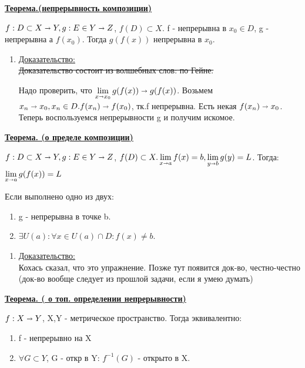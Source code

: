 \documentclass{article}
\newcommand{\thmm}[1]{\underline{\textbf{#1}}}
\newcommand{\prooff}[1]{{\underline{Доказательство:}} \\ }
\begin{document}
\thmm{Теорема.(непрерывность композиции)}

$f: D \subset X \shortrightarrow Y, g: E \in Y \shortrightarrow Z$, $f(D) \subset X.$ f - непрерывна  в $x_0 \in D$, g - непрерывна а $f(x_0)$. Тогда $g(f(x)) $ непрерывна в $x_0$.

\begin{enumerate}
    \item[] \prooff{}
    \sout{Доказательство состоит из волшебных слов: по Гейне.}

    Надо проверить, что $\lim\limits_{x \shortrightarrow x_0} g(f(x)) \shortrightarrow g(f(x))$. Возьмем $x_n \shortrightarrow x_0, x_n \in D. f(x_n) \shortrightarrow f(x_0)$, тк.f непрерывна. Есть некая $f(x_n) \shortrightarrow x_0$. Теперь воспользуемся непрерывности g и получим искомое.
\end{enumerate}

\thmm{Теорема. (о пределе композиции)}

$f: D \subset X \shortrightarrow Y, g: E \in Y \shortrightarrow Z$, $f(D) \subset X. \lim\limits_{x\shortrightarrow a}f(x) = b, \lim\limits_{y\shortrightarrow b} g(y) = L$. Тогда:
$\lim\limits_{x\shortrightarrow a} g(f(x)) = L$

Если выполнено одно из двух:
\begin{enumerate}
    \item g - непрерывна в точке b.
    \item $\exists U(a): \forall x \in U(a) \cap D: f(x) \neq b$.
\end{enumerate}

\begin{enumerate}
    \item[] \prooff{}
    Кохась сказал, что это упражнение. Позже тут появится док-во, честно-честно (док-во вообще следует из прошлой задачи, если я умею думать)
\end{enumerate}


\thmm{Теорема. ( о топ. определении непрерывности)}

$f: X \shortrightarrow Y$, X,Y - метрическое пространство. Тогда эквивалентно:
\begin{enumerate}
    \item f - непрерывно на X
    \item $\forall G \subset Y$, G - откр в Y: $f^{-1}(G)$ - открыто в X.
\end{enumerate}
\end{document}
